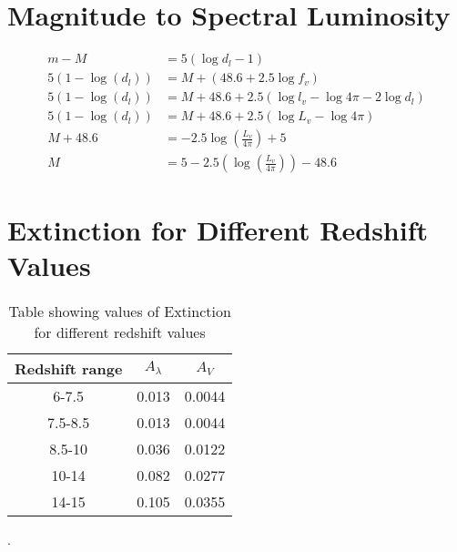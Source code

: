 \section{Magnitude to Spectral Luminosity} %
\label{sec:magnitude_to_spectral_luminosity}
	\begin{align}
		m-M &=5(\log d_l - 1)\\
		5(1-\log (d_l)) &= M + (48.6+2.5\log f_v) \\
		5(1-\log (d_l)) &= M + 48.6 + 2.5(\log l_v - \log 4\pi - 2 \log d_l) \\
		5(1-\log (d_l)) &= M+48.6 + 2.5(\log L_v - \log 4\pi) \\
		M+48.6 &=-2.5 \log (\frac{L_v}{4\pi})+5 \\
		M &=5-2.5(\log (\frac{L_v}{4\pi})) - 48.6
	\end{align}

\section{Extinction for Different Redshift Values} %
\label{sec:extinction_for_different_redshift_values}
	\begin{table}[ht]
		\begin{center}
			\begin{tabular}{c|c|c}
				Redshift range & $A_\lambda$ & $A_V$  \\
				\hline \hline
				6-7.5	   &0.013&  0.0044 \\
				7.5-8.5&0.013&  0.0044 \\
				8.5-10 &0.036&  0.0122\\
				10-14  &0.082&  0.0277\\
				14-15  &0.105&  0.0355\\
			\end{tabular}
		\end{center}
		\caption{Table showing values of Extinction for different redshift values}
		\label{tab:extinction_values}
	\end{table}.

